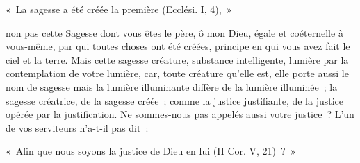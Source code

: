 \documentclass[french,twoside]{book} %
\newenvironment{quoteblock}%
  {\begin{quoting}}
  {\end{quoting}}
\newenvironment{quotebar}{%
    \def\FrameCommand{{\color{rubric!10!}\vrule width 0.5em} \hspace{0.9em}}%
    \def\OuterFrameSep{\itemsep} %
    \MakeFramed {\advance\hsize-\width \FrameRestore}
  }%
  {%
    \endMakeFramed
  }
\renewenvironment{quoteblock}%
  {%
    \savenotes
    \setstretch{0.9}
    \normalfont
    \begin{quotebar}
  }
  {%
    \end{quotebar}
    \spewnotes
  }
\begin{document}
\begin{quoteblock}
\noindent « La sagesse a été créée la première (Ecclési. I, 4), »\end{quoteblock}

\noindent non pas cette Sagesse dont vous êtes le père, ô mon Dieu, égale et coéternelle à vous-même, par qui toutes choses ont été créées, principe en qui vous avez fait le ciel et la terre. Mais cette sagesse créature, substance intelligente, lumière par la contemplation de votre lumière, car, toute créature qu’elle est, elle porte aussi le nom de sagesse mais la lumière illuminante diffère de la lumière illuminée ; la sagesse créatrice, de la sagesse créée ; comme la justice justifiante, de la justice opérée par la justification. Ne sommes-nous pas appelés aussi votre justice ? L’un de vos serviteurs n’a-t-il pas dit :\par

\begin{quoteblock}
\noindent « Afin que nous soyons la justice de Dieu en lui (II Cor. V, 21) ? »\end{quoteblock}
\end{document}
